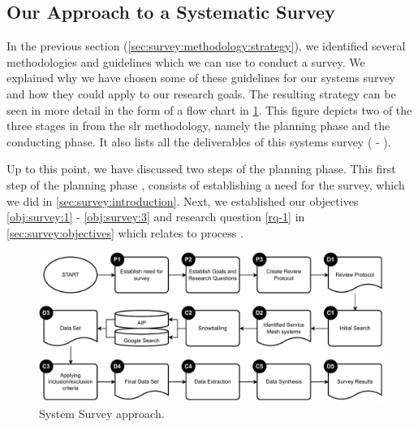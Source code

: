 \subsection{Our Approach to a Systematic Survey}
\label{sec:survey:methodology:approach}

In the previous section (\cref{sec:survey:methodology:strategy}), we identified several methodologies and guidelines which we can use to conduct a survey. We explained why we have chosen some of these guidelines for our systems survey and how they could apply to our research goals. The resulting strategy can be seen in more detail in the form of a flow chart in  \cref{fig:survey-methodology}. This figure depicts two of the three stages in from the \gls{slr} methodology, namely the planning phase and the conducting phase. It also lists all the deliverables of this systems survey ( - ). 

Up to this point, we have discussed two steps of the planning phase. This first step of the planning phase , consists of establishing a need for the survey, which we did in \cref{sec:survey:introduction}. Next, we established our objectives \ref{obj:survey:1} - \ref{obj:survey:3} and research question \ref{rq-1} in \cref{sec:survey:objectives} which relates to process .




\begin{figure}[!t]
    \centering
    
    \includegraphics[width=\linewidth]{3_systems_survey/figures/survey-methodology}

    \caption{System Survey approach.}
    \label{fig:survey-methodology}
\end{figure}




